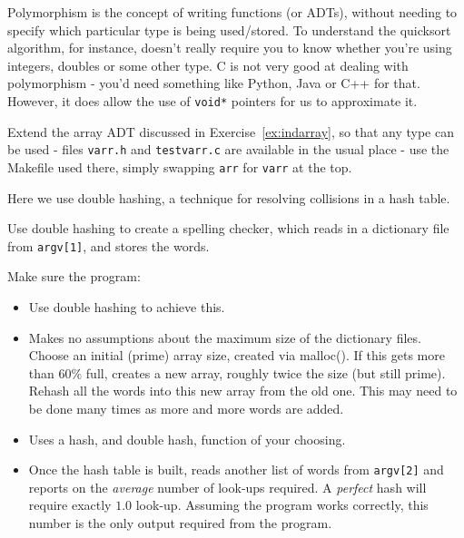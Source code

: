 
Polymorphism is the concept of writing functions (or ADTs), without
needing to specify which particular type is being used/stored. To
understand the quicksort algorithm, for instance, doesn't really require
you to know whether you're using integers, doubles or some other type. C
is not very good at dealing with polymorphism - you'd need something
like Python, Java or C++ for that. However, it does allow the use of
\verb^void*^ pointers for us to approximate it.

\begin{exercise}
Extend the array ADT discussed in
Exercise~\ref{ex:indarray}, so that any type can be used - files
\verb^varr.h^ and \verb^testvarr.c^ are available in the usual place -
use the Makefile used there, simply swapping \verb^arr^ for \verb^varr^
at the top.
\end{exercise}

Here we use double hashing, a technique for resolving collisions in a
hash table.

\begin{exercise}
\label{ex:dblhash}
Use double hashing to create a spelling checker, which reads in a dictionary file
from \verb^argv[1]^, and stores the words.

Make sure the program:
\begin{itemize}
\item Use double hashing to achieve this.
\item Makes no assumptions about the maximum size of the dictionary files. Choose
an initial (prime) array size, created via malloc(). If this gets more than $60\%$ full,
creates a new array, roughly twice the size (but still prime). Rehash all the words into this
new array from the old one. This may need to be done many times as more and more words
are added.
\item Uses a hash, and double hash, function of your choosing.
\item Once the hash table is built, reads another list of words from \verb^argv[2]^
and reports on the {\em average} number of  look-ups required. A {\em perfect} hash
will require exactly $1.0$ look-up. Assuming the program works correctly,
this number is the only output required from the program.
\end{itemize}
\end{exercise}

